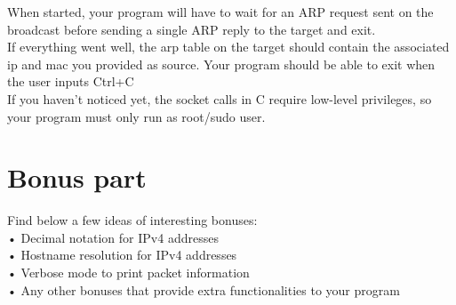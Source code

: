 \documentclass{42-en}
\begin{document}
    When started, your program will have to wait for an ARP request sent on the broadcast before sending a single ARP reply to the target and exit.\\
    If everything went well, the arp table on the target should contain the associated ip and mac you provided as source.
    Your program should be able to exit when the user inputs Ctrl+C\\

    If you haven't noticed yet, the socket calls in C require low-level privileges, so your program must only run as root/sudo user.


\chapter{Bonus part}

 Find below a few ideas of interesting bonuses:\\
 
    • Decimal notation for IPv4 addresses\\
    • Hostname resolution for IPv4 addresses\\
    • Verbose mode to print packet information\\
    • Any other bonuses that provide extra functionalities to your program\\


\end{document}
